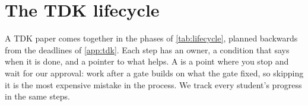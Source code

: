 \clearpage\section{The TDK lifecycle}\label{app:lifecycle}
A TDK paper comes together in the phases of \cref{tab:lifecycle}, planned backwards from the deadlines of \cref{app:tdk}. Each step has an owner, a condition that says when it is done, and a pointer to what helps.
A \gate{} is a point where you stop and wait for our approval: work after a gate builds on what the gate fixed, so skipping it is the most expensive mistake in the process.
We track every student's progress in the same steps.

\newcommand{\lcphase}[2]{\midrule\multicolumn{4}{l}{\textbf{#1}\quad\textit{#2}}\\\midrule}
